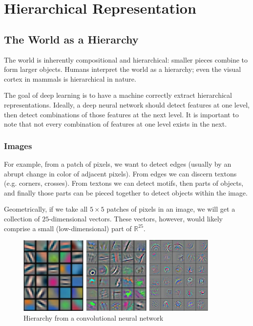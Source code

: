 \chapter{Hierarchical Representation}\label{chp:Hierarchical Representation}

\section{The World as a Hierarchy}

The world is inherently compositional and hierarchical: smaller pieces combine to form larger objects.
Humans interpret the world as a hierarchy; even the visual cortex in mammals is hierarchical in nature.

The goal of deep learning is to have a machine correctly extract hierarchical representations.
Ideally, a deep neural network should detect features at one level, then detect combinations of those features at the next level.
It is important to note that not every combination of features at one level exists in the next.

\subsection{Images}

For example, from a patch of pixels, we want to detect edges (usually by an abrupt change in color of adjacent pixels).
From edges we can discern textons (e.g. corners, crosses).
From textons we can detect motifs, then parts of objects, and finally those parts can be pieced together to detect objects within the image.

Geometrically, if we take all $5\times5$ patches of pixels in an image, we will get a collection of $25$-dimensional vectors.
These vectors, however, would likely comprise a small (low-dimensional) part of $\mathbb{R}^{25}$.

\begin{figure}[ht]
\centering
\includegraphics[width=100mm]{lectures/01-b/cnn_hierarchy.png}
\caption{Hierarchy from a convolutional neural network}
\label{fig:cnn_hierarchy}
\end{figure}

